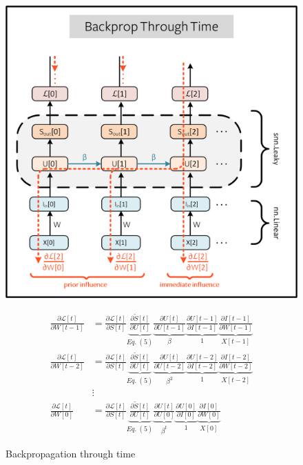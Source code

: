 \documentclass[11pt]{article}
\begin{document}
\begin{figure}[H]
  \begin{minipage}{0.5\textwidth}
    \centering
    \includegraphics[width=\textwidth]{image/bptt.png}
    \caption{Backpropagation through time}
    \label{fig:bptt}
  \end{minipage}
  \hspace{0.5cm}
  \begin{minipage}{0.5\textwidth}
    \begin{equation*}
      \begin{aligned}
        \frac{\partial \mathcal{L}[t]}{\partial W[t-1]} & =
        \frac{\partial \mathcal{L}[t]}{\partial S[t]}
        \underbrace{\frac{\partial \tilde{S}[t]}{\partial U[t]}}_{Eq.~(5)}
        \underbrace{\frac{\partial U[t]}{\partial U[t-1]}}_\beta
        \underbrace{\frac{\partial U[t-1]}{\partial I[t-1]}}_1
        \underbrace{\frac{\partial I[t-1]}{\partial W[t-1]}}_{X[t-1]} \\
        \frac{\partial \mathcal{L}[t]}{\partial W[t-2]} & =
        \frac{\partial \mathcal{L}[t]}{\partial S[t]}
        \underbrace{\frac{\partial \tilde{S}[t]}{\partial U[t]}}_{Eq.~(5)}
        \underbrace{\frac{\partial U[t]}{\partial U[t-2]}}_{\beta^2}
        \underbrace{\frac{\partial U[t-2]}{\partial I[t-2]}}_1
        \underbrace{\frac{\partial I[t-2]}{\partial W[t-2]}}_{X[t-2]} \\
                                                        & \vdots      \\
        \frac{\partial \mathcal{L}[t]}{\partial W[0]}   & =
        \frac{\partial \mathcal{L}[t]}{\partial S[t]}
        \underbrace{\frac{\partial \tilde{S}[t]}{\partial U[t]}}_{Eq.~(5)}
        \underbrace{\frac{\partial U[t]}{\partial U[0]}}_{\beta^t}
        \underbrace{\frac{\partial U[0]}{\partial I[0]}}_1
        \underbrace{\frac{\partial I[0]}{\partial W[0]}}_{X[0]}
      \end{aligned}
    \end{equation*}
  \end{minipage}
\end{figure}
\end{document}
